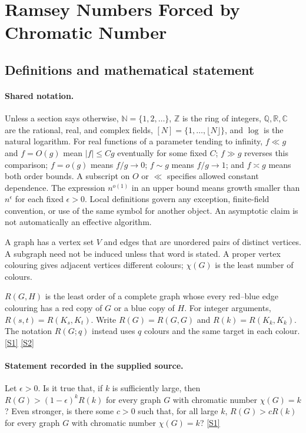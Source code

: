 \documentclass[11pt,a4paper]{article}
\newcommand{\N}{\mathbb{N}}
\newcommand{\Z}{\mathbb{Z}}
\newcommand{\Q}{\mathbb{Q}}
\newcommand{\R}{\mathbb{R}}
\newcommand{\C}{\mathbb{C}}
\newcommand{\sref}[2]{\hyperlink{source:#1:#2}{[S#2]}}
\begin{document}
\section{Ramsey Numbers Forced by Chromatic Number}\label{statement}


\subsection{Definitions and mathematical statement}

\paragraph{Shared notation.}Unless a section says otherwise, $\N=\{1,2,\ldots\}$,
$\Z$ is the ring of integers, $\Q,\R,\C$ are the rational, real, and complex
fields, $[N]=\{1,\ldots,\lfloor N\rfloor\}$, and $\log$ is the natural
logarithm. For real functions of a parameter tending to infinity,
$f\ll g$ and $f=O(g)$ mean $|f|\leq Cg$ eventually for some fixed $C$;
$f\gg g$ reverses this comparison; $f=o(g)$ means $f/g\to0$;
$f\sim g$ means $f/g\to1$; and $f\asymp g$ means both order bounds.
A subscript on $O$ or $\ll$ specifies allowed constant dependence.
The expression $n^{o(1)}$ in an upper bound means growth smaller than
$n^\epsilon$ for each fixed $\epsilon>0$. Local definitions govern any
exception, finite-field convention, or use of the same symbol for another
object. An asymptotic claim is not automatically an effective algorithm.



A graph has a vertex set $V$ and edges that are unordered pairs of distinct vertices. A subgraph need not be induced unless that word is stated. A proper vertex colouring gives adjacent vertices different colours; $\chi(G)$ is the least number of colours.

$R(G,H)$ is the least order of a complete graph whose every red--blue edge colouring has a red copy of $G$ or a blue copy of $H$. For integer arguments, $R(s,t)=R(K_s,K_t)$. Write $R(G)=R(G,G)$ and $R(k)=R(K_k,K_k)$. The notation $R(G;q)$ instead uses $q$ colours and the same target in each colour. \sref{statement}{1} \sref{statement}{2}

\paragraph{Statement recorded in the supplied source.}
Let $\epsilon >0$. Is it true that, if $k$ is sufficiently large, then $ R(G)>(1-\epsilon)^kR(k) $ for every graph $G$ with chromatic number $\chi(G)=k$?
Even stronger, is there some $c>0$ such that, for all large $k$, $R(G)>cR(k)$ for every graph $G$ with chromatic number $\chi(G)=k$? \sref{statement}{1}
\end{document}
